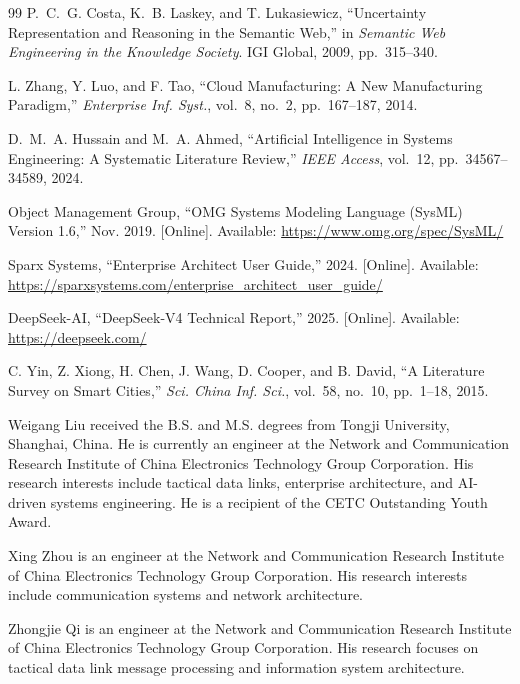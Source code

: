 \documentclass{ieeeaccess}
\begin{document}
\begin{thebibliography}{99}
P.~C.~G. Costa, K.~B. Laskey, and T. Lukasiewicz, ``Uncertainty Representation and Reasoning in the Semantic Web,'' in \textit{Semantic Web Engineering in the Knowledge Society}. IGI Global, 2009, pp.~315--340.

L. Zhang, Y. Luo, and F. Tao, ``Cloud Manufacturing: A New Manufacturing Paradigm,'' \textit{Enterprise Inf. Syst.}, vol.~8, no.~2, pp.~167--187, 2014.

D.~M.~A. Hussain and M.~A. Ahmed, ``Artificial Intelligence in Systems Engineering: A Systematic Literature Review,'' \textit{IEEE Access}, vol.~12, pp.~34567--34589, 2024.

Object Management Group, ``OMG Systems Modeling Language (SysML) Version 1.6,'' Nov. 2019. [Online]. Available: \url{https://www.omg.org/spec/SysML/}

Sparx Systems, ``Enterprise Architect User Guide,'' 2024. [Online]. Available: \url{https://sparxsystems.com/enterprise_architect_user_guide/}

DeepSeek-AI, ``DeepSeek-V4 Technical Report,'' 2025. [Online]. Available: \url{https://deepseek.com/}

C. Yin, Z. Xiong, H. Chen, J. Wang, D. Cooper, and B. David, ``A Literature Survey on Smart Cities,'' \textit{Sci. China Inf. Sci.}, vol.~58, no.~10, pp.~1--18, 2015.

\end{thebibliography}

\begin{IEEEbiography}{Weigang Liu}
received the B.S. and M.S. degrees from Tongji University, Shanghai, China. He is currently an engineer at the Network and Communication Research Institute of China Electronics Technology Group Corporation. His research interests include tactical data links, enterprise architecture, and AI-driven systems engineering. He is a recipient of the CETC Outstanding Youth Award.
\end{IEEEbiography}

\begin{IEEEbiography}{Xing Zhou}
is an engineer at the Network and Communication Research Institute of China Electronics Technology Group Corporation. His research interests include communication systems and network architecture.
\end{IEEEbiography}

\begin{IEEEbiography}{Zhongjie Qi}
is an engineer at the Network and Communication Research Institute of China Electronics Technology Group Corporation. His research focuses on tactical data link message processing and information system architecture.
\end{IEEEbiography}
\end{document}

